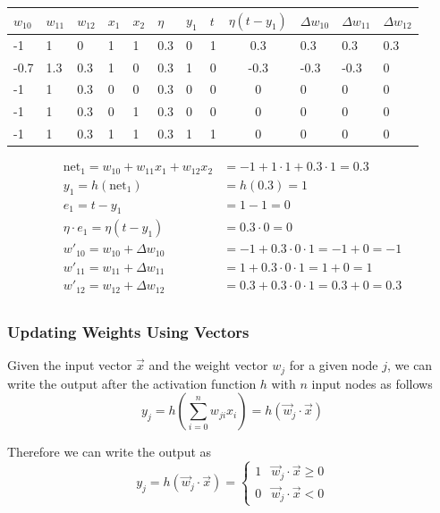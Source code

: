 \documentclass[11pt]{article}
\begin{document}
\begin{tabularx}{\linewidth}{XXXXXXXXcXXX}
    \hline
    $w_{10}$ & $w_{11}$ & $w_{12}$ & $x_1$ & $x_2$ & $\eta$ & $y_1$ & $t$ & $\eta (t-y_1)$ & $\Delta w_{10}$ & $\Delta w_{11}$ & $\Delta w_{12}$\\
    \hline
    -1 & 1 & 0 & 1 & 1 & 0.3 & 0 & 1 & 0.3 & 0.3 & 0.3 & 0.3\\
    \hline
    -0.7 & 1.3 & 0.3 & 1 & 0 & 0.3 & 1 & 0 & -0.3 & -0.3 & -0.3 & 0\\
    \hline
    -1 & 1 & 0.3 & 0 & 0 & 0.3 & 0 & 0 & 0 & 0 & 0 & 0\\
    \hline
    -1 & 1 & 0.3 & 0 & 1 & 0.3 & 0 & 0 & 0 & 0 & 0 & 0\\
    \hline
    -1 & 1 & 0.3 & 1 & 1 & 0.3 & 1 & 1 & 0 & 0 & 0 & 0\\
    \hline
\end{tabularx}

\begin{align*}
\text{net}_1 = w_{10} + w_{11}x_1 + w_{12}x_2 &= -1 + 1 \cdot 1 + 0.3 \cdot 1 = 0.3\\
y_1 = h(\text{net}_1) &= h(0.3) = 1\\
e_1 = t - y_1 &= 1 - 1 = 0\\
\eta \cdot e_1 = \eta (t - y_1) &= 0.3\cdot 0 = 0\\
w'_{10} = w_{10} + \Delta w_{10} &= -1 + 0.3\cdot 0 \cdot 1 = -1 + 0 = -1\\
w'_{11} = w_{11} + \Delta w_{11} &= 1 + 0.3\cdot 0 \cdot 1 = 1 + 0 = 1 \\
w'_{12} = w_{12} + \Delta w_{12} &= 0.3 + 0.3\cdot 0 \cdot 1 = 0.3 + 0 = 0.3 \\
\end{align*}

\subsubsection{Updating Weights Using Vectors}

Given the input vector $\vec{x}$ and the weight vector $w_j$ for a given node $j$, we can write the output after the activation function $h$ with $n$ input nodes as follows
\begin{equation}
    y_j = h\left( \sum_{i=0}^{n} w_{ji} x_i \right) = h(\vec{w}_j \cdot \vec{x})
\end{equation}

\noindent
Therefore we can write the output as
\begin{equation}
y_j = h(\vec{w}_j \cdot \vec{x}) = \left\{ \begin{matrix} 1 & \vec{w}_j \cdot \vec{x} \geq 0\\ 0 & \vec{w}_j \cdot \vec{x} < 0 \end{matrix} \right.
\end{equation}
\end{document}
